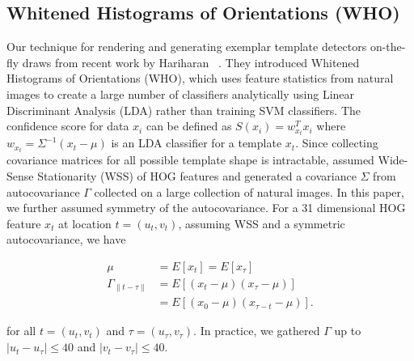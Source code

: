 \subsection{Whitened Histograms of Orientations (WHO)}
\label{sec:who}
Our technique for rendering and generating exemplar template detectors
on-the-fly draws from recent work by Hariharan \etal~\cite{Hariharan12}. They introduced Whitened
Histograms of Orientations (WHO), which uses feature statistics from natural
images to create a large number of classifiers analytically using Linear
Discriminant Analysis (LDA) rather than training SVM
classifiers. The confidence score for data $x_i$ can be
defined as $ S(x_i) = w_{x_t}^T x_i$ where $w_{x_t} = \Sigma^{-1} (x_t - \mu)$
is an LDA classifier for a template $x_t$. Since collecting covariance matrices
for all possible template shape is intractable, \cite{Hariharan12} assumed
Wide-Sense Stationarity (WSS) of HOG features and generated a covariance
$\Sigma$ from autocovariance $\Gamma$ collected on a large collection of
natural images. In this paper, we further assumed symmetry of the
autocovariance. For a 31 dimensional HOG feature $x_t$ at location $t = (u_t,
v_t)$, assuming WSS and a symmetric autocovariance, we have

\begin{align}
    \mu & = E[x_t] = E[x_\tau]\\
    \Gamma_{\|t - \tau\|} & = E[(x_{t} - \mu ) (x_{\tau} - \mu)] \\
              & = E[(x_0 - \mu)(x_{\tau - t} - \mu)].
\end{align}

for all $t = (u_t, v_t)$ and $\tau = (u_\tau, v_\tau)$. In practice, we gathered $\Gamma$ up to $|u_t - u_\tau |
\le 40$ and $|v_t - v_\tau| \le 40$.



% 
% 


